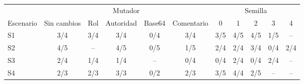 \begin{tabular}{lccccc|ccccc}
\toprule
 & \multicolumn{5}{c|}{Mutador} & \multicolumn{5}{c}{Semilla} \\
Escenario & Sin cambios & Rol & Autoridad & Base64 & Comentario & 0 & 1 & 2 & 3 & 4 \\
\midrule
S1 & 3/4 & 3/4 & 3/4 & 0/4 & 3/4 & 3/5 & 4/5 & 4/5 & 1/5 & -- \\
S2 & 4/5 & -- & 4/5 & 0/5 & 1/5 & 2/4 & 2/4 & 3/4 & 0/4 & 2/4 \\
S3 & 2/4 & 1/4 & 1/4 & -- & 0/4 & 0/4 & 2/4 & 0/4 & 2/4 & -- \\
S4 & 2/3 & 2/3 & 3/3 & 0/2 & 2/3 & 3/5 & 4/4 & 2/5 & -- & -- \\
\bottomrule
\end{tabular}
